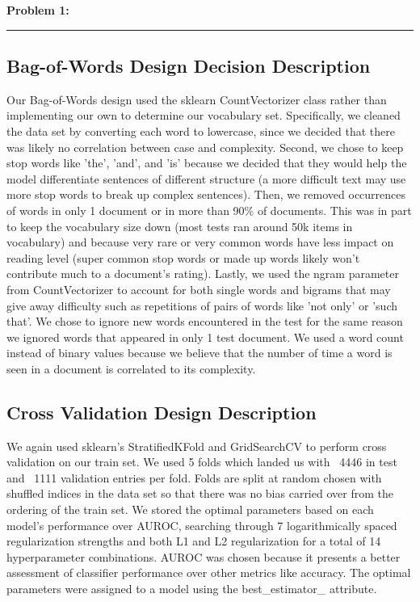\documentclass{article}
\newcommand{\CustomSection}[1]{%
  \vspace{2ex}%
  \noindent\textbf{\LARGE #1}\\
  \vspace{0.5ex}%
  \textcolor{blue!50!cyan}{\rule{0.8\textwidth}{1pt}}\par
}
\begin{document}
\CustomSection{Problem 1:}
\subsection{Bag-of-Words Design Decision Description}
Our Bag-of-Words design used the sklearn CountVectorizer class rather than implementing our own to determine our vocabulary set. Specifically, we cleaned the data set by converting each word to lowercase, since we decided that there was likely no correlation between case and complexity. Second, we chose to keep stop words like 'the', 'and', and 'is' because we decided that they would help the model differentiate sentences of different structure (a more difficult text may use more stop words to break up complex sentences). Then, we removed occurrences of words in only 1 document or in more than 90\% of documents. This was in part to keep the vocabulary size down (most tests ran around 50k items in vocabulary) and because very rare or very common words have less impact on reading level (super common stop words or made up words likely won't contribute much to a document's rating).  Lastly, we used the ngram parameter from CountVectorizer to account for both single words and bigrams that may give away difficulty such as repetitions of pairs of words like 'not only' or 'such that'. We chose to ignore new words encountered in the test for the same reason we ignored words that appeared in only 1 test document. We used a word count instead of binary values because we believe that the number of time a word is seen in a document is correlated to its complexity.

\subsection{Cross Validation Design Description}
We again used sklearn's StratifiedKFold and GridSearchCV to perform cross validation on our train set. We used 5 folds which landed us with ~4446 in test and ~1111 validation entries per fold. Folds are split at random chosen with shuffled indices in the data set so that there was no bias carried over from the ordering of the train set. We stored the optimal parameters based on each model's performance over AUROC, searching through 7 logarithmically spaced regularization strengths and both L1 and L2 regularization for a total of 14 hyperparameter combinations. AUROC was chosen because it presents a better assessment of classifier performance over other metrics like accuracy. The optimal parameters were assigned to a model using the best\_estimator\_ attribute.
\end{document}
